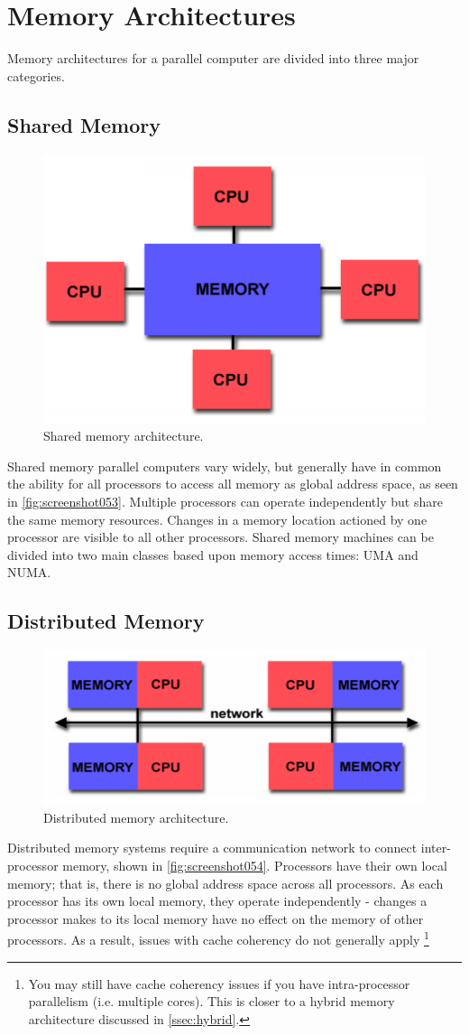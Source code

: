 \section{Memory Architectures}
Memory architectures for a parallel computer are divided into three major categories.

\subsection{Shared Memory}
\begin{figure}
\centering
\includegraphics[width=0.5\linewidth]{figures/screenshot053}
\caption{Shared memory architecture.}
\label{fig:screenshot053}
\end{figure}

Shared memory parallel computers vary widely, but generally have in common the ability for all processors to access all memory as global address space, as seen in \autoref{fig:screenshot053}. Multiple processors can operate independently but share the same memory resources. Changes in a memory location actioned by one processor are visible to all other processors. Shared memory machines can be divided into two main classes based upon memory access times: UMA and NUMA. 

\subsection{Distributed Memory}
\begin{figure}
\centering
\includegraphics[width=0.5\linewidth]{figures/screenshot054}
\caption{Distributed memory architecture.}
\label{fig:screenshot054}
\end{figure}

Distributed memory systems require a communication network to connect inter-processor memory, shown in \autoref{fig:screenshot054}. Processors have their own local memory; that is, there is no global address space across all processors. As each processor has its own local memory, they operate independently - changes a processor makes to its local memory have no effect on the memory of other processors. As a result, issues with cache coherency do not generally apply \footnote{You may still have cache coherency issues if you have intra-processor parallelism (i.e. multiple cores). This is closer to a hybrid memory architecture discussed in \autoref{ssec:hybrid}.}

